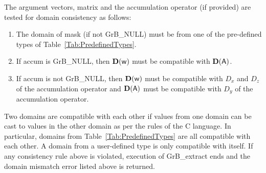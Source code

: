 The argument vectors, matrix and the accumulation 
operator (if provided) are tested for domain consistency as follows:
\begin{enumerate}
	\item The domain of {\sf mask} (if not {\sf GrB\_NULL}) must be from one of 
    the pre-defined types of Table~\ref{Tab:PredefinedTypes}.

	\item If {\sf accum} is {\sf GrB\_NULL}, then $\bold{D}({\sf w})$ must be 
    compatible with $\bold{D}({\sf A})$.

	\item If {\sf accum} is not {\sf GrB\_NULL}, then $\bold{D}({\sf w})$ must be
    compatible with $D_x$ and $D_z$ of the accumulation operator and 
    $\bold{D}({\sf A})$ must be compatible with $D_y$ of the accumulation operator.
\end{enumerate}
Two domains are compatible with each other if values from one domain can be cast 
to values in the other domain as per the rules of the C language.
In particular, domains from Table~\ref{Tab:PredefinedTypes} are all compatible 
with each other. A domain from a user-defined type is only compatible with itself.
If any consistency rule above is violated, execution of {\sf GrB\_extract} ends
and the domain mismatch error listed above is returned.

